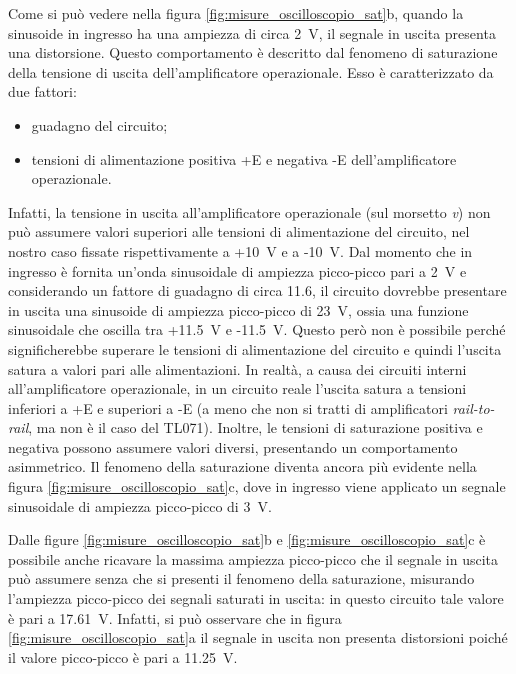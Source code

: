 \newpage
\noindent
Come si può vedere nella figura \ref{fig:misure_oscilloscopio_sat}b, quando la sinusoide in ingresso ha una ampiezza di circa \SI{2}{\volt}, il segnale in uscita presenta una distorsione. Questo comportamento è descritto dal fenomeno di saturazione della tensione di uscita dell'amplificatore operazionale. Esso è caratterizzato da due fattori:
\begin{itemize}
	\item guadagno del circuito;
	\item tensioni di alimentazione positiva +E e negativa -E dell'amplificatore operazionale.
\end{itemize} 
Infatti, la tensione in uscita all'amplificatore operazionale (sul morsetto \textit{v}) non può assumere valori superiori alle tensioni di alimentazione del circuito, nel nostro caso fissate rispettivamente a +\SI{10}{\volt} e a -\SI{10}{\volt}. Dal momento che in ingresso è fornita un'onda sinusoidale di ampiezza picco-picco pari a \SI{2}{\volt} e considerando un fattore di guadagno di circa 11.6, il circuito dovrebbe presentare in uscita una sinusoide di ampiezza picco-picco di \SI{23}{\volt}, ossia una funzione sinusoidale che oscilla tra +\SI{11.5}{\volt} e -\SI{11.5}{\volt}. Questo però non è possibile perché significherebbe superare le tensioni di alimentazione del circuito e quindi l'uscita satura a valori pari alle alimentazioni. In realtà, a causa dei circuiti interni all'amplificatore operazionale, in un circuito reale l'uscita satura a tensioni inferiori a +E e superiori a -E (a meno che non si tratti di amplificatori \textit{rail-to-rail}, ma non è il caso del TL071). Inoltre, le tensioni di saturazione positiva e negativa possono assumere valori diversi, presentando un comportamento asimmetrico. Il fenomeno della saturazione diventa ancora più evidente nella figura \ref{fig:misure_oscilloscopio_sat}c, dove in ingresso viene applicato un segnale sinusoidale di ampiezza picco-picco di \SI{3}{\volt}.

\noindent
Dalle figure \ref{fig:misure_oscilloscopio_sat}b e \ref{fig:misure_oscilloscopio_sat}c  è possibile anche ricavare la massima ampiezza picco-picco che il segnale in uscita può assumere senza che si presenti il fenomeno della saturazione, misurando l'ampiezza picco-picco dei segnali saturati in uscita: in questo circuito tale valore è pari a \SI{17.61}{\volt}. Infatti, si può osservare che in figura \ref{fig:misure_oscilloscopio_sat}a il segnale in uscita non presenta distorsioni poiché il valore picco-picco è pari a \SI{11.25}{\volt}. 

